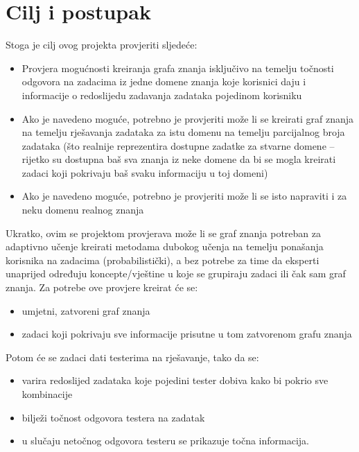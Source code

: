 \chapter{Cilj i postupak}
Stoga je cilj ovog projekta provjeriti sljedeće:
\begin{itemize}
\item Provjera mogućnosti kreiranja grafa znanja isključivo na temelju točnosti odgovora na zadacima iz jedne domene znanja koje korisnici daju i informacije o redoslijedu zadavanja zadataka pojedinom korisniku
\item Ako je navedeno moguće, potrebno je provjeriti može li se kreirati graf znanja na temelju rješavanja zadataka za istu domenu na temelju parcijalnog broja zadataka (što realnije reprezentira dostupne zadatke za stvarne domene – rijetko su dostupna baš sva znanja iz neke domene da bi se mogla kreirati zadaci koji pokrivaju baš svaku informaciju u toj domeni)
\item Ako je navedeno moguće, potrebno je provjeriti može li se isto napraviti i za neku domenu realnog znanja\newline
\end{itemize}
Ukratko, ovim se projektom provjerava može li se graf znanja potreban za adaptivno učenje kreirati metodama dubokog učenja na temelju ponašanja korisnika na zadacima (probabilistički), a bez potrebe za time da eksperti unaprijed određuju koncepte/vještine u koje se grupiraju zadaci ili čak sam graf znanja.\newline\newline
Za potrebe ove provjere kreirat će se:
\begin{itemize}
	\item umjetni, zatvoreni graf znanja 
	\item zadaci koji pokrivaju sve informacije prisutne u tom zatvorenom grafu znanja\newline
\end{itemize}
Potom će se zadaci dati testerima na rješavanje, tako da se:
\begin{itemize}
	\item varira redoslijed zadataka koje pojedini tester dobiva kako bi pokrio sve kombinacije
	\item bilježi točnost odgovora testera na zadatak
	\item u slučaju netočnog odgovora testeru se prikazuje točna informacija.
\end{itemize}

